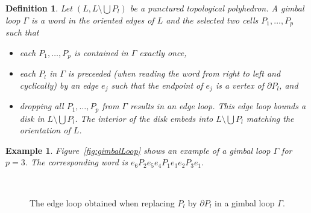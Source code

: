 \documentclass[utopia,fullpage]{nmd/article}
\newtheorem{definition}[theorem]{Definition}
\newtheorem{example}[theorem]{Example}
\newcommand\myPath{\Gamma}
\begin{document}
\begin{definition} \label{def:gimbalLoop}
Let $(L,L\setminus \bigcup P_l)$ be a punctured topological polyhedron. A gimbal loop $\myPath$ is a word in the oriented edges of $L$ and the selected two cells $P_1, \dots, P_p$ such that
\begin{itemize}
\item each $P_1, \dots, P_p$ is contained in $\myPath$ exactly once,
\item each $P_l$ in $\myPath$ is preceeded (when reading the word from right to left and cyclically) by an edge $e_j$ such that the endpoint of $e_j$ is a vertex of $\partial P_l$, and
\item dropping all $P_1, \dots, P_p$ from $\myPath$ results in an edge loop. This edge loop bounds a disk in $L\setminus\bigcup P_l$. The interior of the disk embeds into $L\setminus\bigcup P_l$ matching the orientation of $L$.

\end{itemize}
\end{definition}



\begin{example} \label{example:GimbalLoop}
Figure~\ref{fig:gimbalLoop} shows an example of a gimbal loop $\myPath$ for $p=3$. The corresponding word is $e_6 P_2 e_5 e_4 P_1 e_3 e_2 P_3 e_1.$
\end{example}

\begin{figure}[htb]
 \begin{minipage}{\textwidth}
  \begin{center}
   \begin{minipage}{0.49\textwidth}
    \begin{center}
     \scalebox{0.25}{
      
     }
    \end{center}
   \end{minipage}
   \begin{minipage}{0.49\textwidth}
    \begin{center}
     \scalebox{0.25}{
      
     }
    \end{center}
   \end{minipage}%
\\ \vspace{0.4cm}
   \begin{minipage}[t]{0.49\textwidth}
    \caption{The edge loop obtained when dropping the $P_l$ from a gimbal loop $\myPath$.} \label{fig:gimbalLoop}
   \end{minipage}
   \begin{minipage}[t]{0.49\textwidth}
    \caption{The edge loop obtained when replacing $P_l$ by $\partial P_l$ in a gimbal loop $\myPath$.} \label{fig:splicedGimbalLoop}
   \end{minipage}
  \end{center}
 \end{minipage}
\end{figure}
\end{document}
